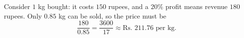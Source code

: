 Consider $1$ kg bought: it costs $150$ rupees, and a $20\%$ profit means revenue $180$ rupees. Only $0.85$ kg can be sold, so the price must be
\[\dfrac{180}{0.85}=\dfrac{3600}{17}\approx\boxed{\text{Rs. }211.76\text{ per kg}}.\]
